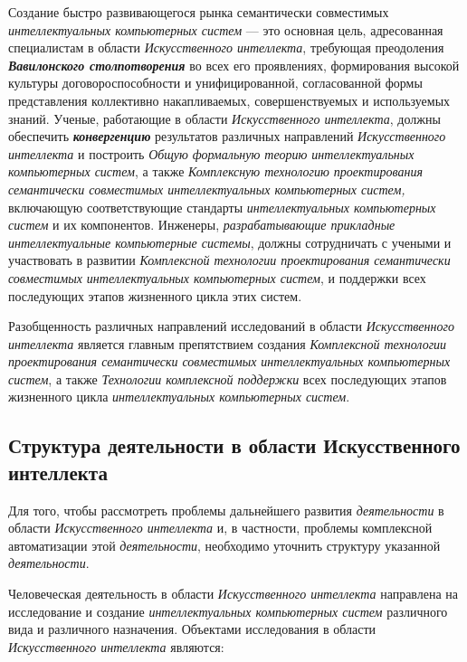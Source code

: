 Создание быстро развивающегося рынка семантически совместимых \textit{интеллектуальных компьютерных систем} --- это основная цель, адресованная специалистам в области \textit{Искусственного интеллекта}, требующая преодоления \textbf{\textit{Вавилонского столпотворения}} во всех его проявлениях, формирования высокой культуры договороспособности и унифицированной, согласованной формы представления коллективно накапливаемых, совершенствуемых и используемых знаний. Ученые, работающие в области \textit{Искусственного интеллекта}, должны обеспечить \textbf{\textit{конвергенцию}} результатов различных направлений \textit{Искусственного интеллекта} и построить \textit{Общую формальную теорию интеллектуальных компьютерных систем}, а также \textit{Комплексную технологию проектирования семантически совместимых интеллектуальных компьютерных систем,} включающую соответствующие стандарты \textit{интеллектуальных компьютерных систем} и их компонентов. Инженеры, \textit{разрабатывающие прикладные интеллектуальные компьютерные системы}, должны сотрудничать с учеными и участвовать в развитии \textit{Комплексной технологии проектирования семантически совместимых интеллектуальных компьютерных систем}, и поддержки всех последующих этапов жизненного цикла этих систем.

Разобщенность различных направлений исследований в области \textit{Искусственного интеллекта} является главным препятствием создания \textit{Комплексной технологии проектирования семантически совместимых интеллектуальных компьютерных систем}, а также \textit{Технологии комплексной поддержки} всех последующих этапов жизненного цикла \textit{интеллектуальных компьютерных систем}.

\subsection{Структура деятельности в области Искусственного интеллекта}
\label{subsec_activity_structure}

Для того, чтобы рассмотреть проблемы дальнейшего развития \textit{деятельности} в области \textit{Искусственного интеллекта} и, в частности, проблемы комплексной автоматизации этой \textit{деятельности}, необходимо уточнить структуру указанной \textit{деятельности}.

Человеческая деятельность в области \textit{Искусственного интеллекта} направлена на исследование и создание \textit{интеллектуальных компьютерных систем} различного вида и различного назначения. Объектами исследования в области \textit{Искусственного интеллекта} являются:

